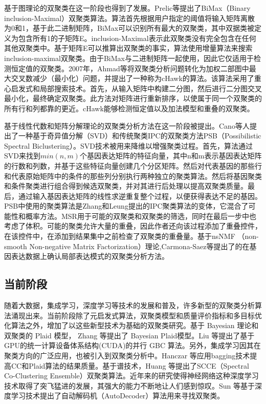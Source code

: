     基于图理论的双聚类在这一阶段也得到了发展。Prelic等提出了BiMax（Binary inclusion-Maximal）双聚类算法。算法首先根据用户指定的阈值将输入矩阵离散为0和1，基于此二进制矩阵，BiMax可以识别所有最大的双聚类，其中双据类被定义为包含所有1的子矩阵E。inclusion-Maximal表示此双聚类没有完全包含在任何其他双聚类中。基于矩阵E可以推算出双聚类的事实，算法使用增量算法来搜索inclusion-maximal双聚类。由于BiMax与二进制矩阵一起使用，因此它仅适用于检测恒定值的双聚类。2007年，Ahmad等将双聚类分析问题转化为加权二部图中最大交叉数减少（最小化）问题，并提出了一种称为cHawk的算法。该算法采用了重心启发式和局部搜索技术。首先，从输入矩阵中构建二分图，然后进行二分图交叉最小化，最终确定双聚类。此方法对矩阵进行重新排序，以使属于同一个双聚类的所有行和列都靠的更近。cHawk能够检测恒定值以及加法模型和重叠的双聚类。

    基于线性代数和矩阵分解理论的双聚类分析方法在这一阶段被提出。Cano等人提出了一种基于奇异值分解（SVD）和传统聚类IPC的双聚类方法PSB（Possibilistic Spectral Biclustering）。SVD技术被用来降维以增强聚类过程。首先，算法通过SVD来找到$min(n, m)$个基因表达矩阵的特征向量，其中n和m表示基因表达矩阵的行数和列数，并基于这些特征向量创建几个分区矩阵。然后对代表基因的那些行和代表原始矩阵中的条件的那些列分别执行两种独立的聚类算法。然后将基因聚类和条件聚类进行组合得到候选双聚类，并对其进行后处理以提高双聚类质量。最后，通过输入基因表达矩阵的线性求逆重复整个过程，以便获得表达不足的基因。PSB中使用的聚类算法是Zhang和Leung提出的IPC聚类算法的变体，它混合了可能性和概率方法。MSR用于可能的双聚类和双聚类的筛选，同时在最后一步中也考虑了体积。可能的聚类允许大量的重叠，因此作者还向该过程添加了重叠控件，在该控件中，在添加到结果集中之前检查了双聚类的重叠量。基于nsNMF （non-smooth Non-negative Matrix Factorization）理论,Carmona-Saez等提出了的在基因表达数据上确认局部表达模式的双聚类分析方法。
    
    \subsection{当前阶段}
    随着大数据，集成学习，深度学习等技术的发展和普及，许多新型的双聚类分析算法涌现出来。当前阶段除了元启发式算法，双聚类模型和质量评价指标和多目标优化算法之外，增加了以这些新型技术为基础的双聚类研究。基于 Bayesian 理论和双聚类的 Plaid 模型， Zhang 等提出了 Bayesian Plaid模型。Liu 等提出了基于GPU的统一计算设备体系结构(CUDA)的并行 GBC 算法。另外，集成学习因其在聚类方向的广泛应用，也被引入到双聚类分析中。Hanczar 等应用bagging技术提高CC和Plaid算法的结果质量。基于谱技术，Huang 等提出了SCCE（Spectral Co-Clustering Ensemble）双聚类算法。近年来的研究使得神经网络这种深度学习技术取得了突飞猛进的发展，其强大的能力不断地让人们感到惊叹。Sun 等基于深度学习技术提出了自动解码机（AutoDecoder）算法用来寻找双聚类。

